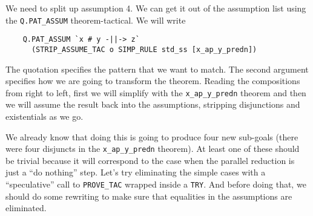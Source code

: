 \documentclass[12pt]{article}
\begin{document}
We need to split up assumption 4.  We can get it out of the assumption
list using the \texttt{Q.PAT\_ASSUM} theorem-tactical.  We will write
\begin{verbatim}
    Q.PAT_ASSUM `x # y -||-> z`
      (STRIP_ASSUME_TAC o SIMP_RULE std_ss [x_ap_y_predn])
\end{verbatim}
The quotation specifies the pattern that we want to match.  The second
argument specifies how we are going to transform the theorem.  Reading
the compositions from right to left, first we will simplify with the
\verb!x_ap_y_predn! theorem and then we will assume the result back
into the assumptions, stripping disjunctions and existentials as we
go.

We already know that doing this is going to produce four new sub-goals
(there were four disjuncts in the \verb!x_ap_y_predn! theorem).  At
least one of these should be trivial because it will correspond to the
case when the parallel reduction is just a ``do nothing'' step.  Let's
try eliminating the simple cases with a ``speculative'' call to
\texttt{PROVE\_TAC} wrapped inside a \texttt{TRY}.  And before doing
that, we should do some rewriting to make sure that equalities in the
assumptions are eliminated.
\end{document}
